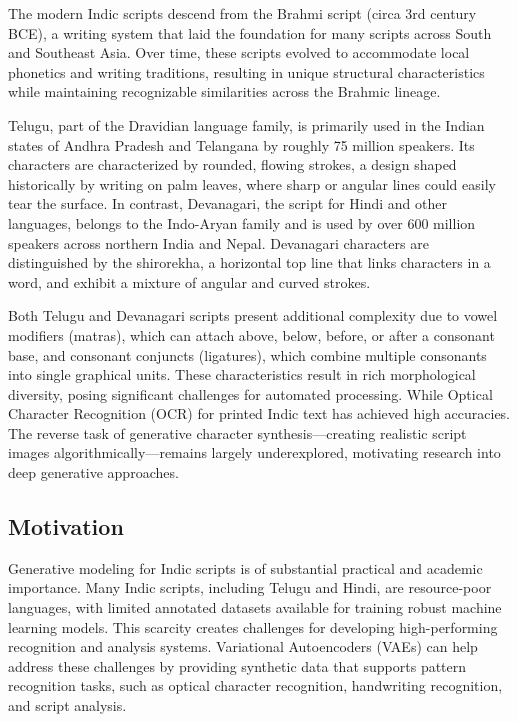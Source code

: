 \documentclass[review]{elsarticle}
\begin{document}
The modern Indic scripts descend from the Brahmi script (circa 3rd century BCE), a writing system that laid the foundation for many scripts across South and Southeast Asia. Over time, these scripts evolved to accommodate local phonetics and writing traditions, resulting in unique structural characteristics while maintaining recognizable similarities across the Brahmic lineage.


Telugu, part of the Dravidian language family, is primarily used in the Indian states of Andhra Pradesh and Telangana by roughly 75 million speakers. Its characters are characterized by rounded, flowing strokes, a design shaped historically by writing on palm leaves, where sharp or angular lines could easily tear the surface. In contrast, Devanagari, the script for Hindi and other languages, belongs to the Indo-Aryan family and is used by over 600 million speakers across northern India and Nepal. Devanagari characters are distinguished by the shirorekha, a horizontal top line that links characters in a word, and exhibit a mixture of angular and curved strokes.


Both Telugu and Devanagari scripts present additional complexity due to vowel modifiers (matras), which can attach above, below, before, or after a consonant base, and consonant conjuncts (ligatures), which combine multiple consonants into single graphical units. These characteristics result in rich morphological diversity, posing significant challenges for automated processing. While Optical Character Recognition (OCR) for printed Indic text has achieved high accuracies. The reverse task of generative character synthesis—creating realistic script images algorithmically—remains largely underexplored, motivating research into deep generative approaches.

\subsection{Motivation}

Generative modeling for Indic scripts is of substantial practical and academic importance. Many Indic scripts, including Telugu and Hindi, are resource-poor languages, with limited annotated datasets available for training robust machine learning models. This scarcity creates challenges for developing high-performing recognition and analysis systems. Variational Autoencoders (VAEs) can help address these challenges by providing synthetic data that supports pattern recognition tasks, such as optical character recognition, handwriting recognition, and script analysis.
\end{document}
